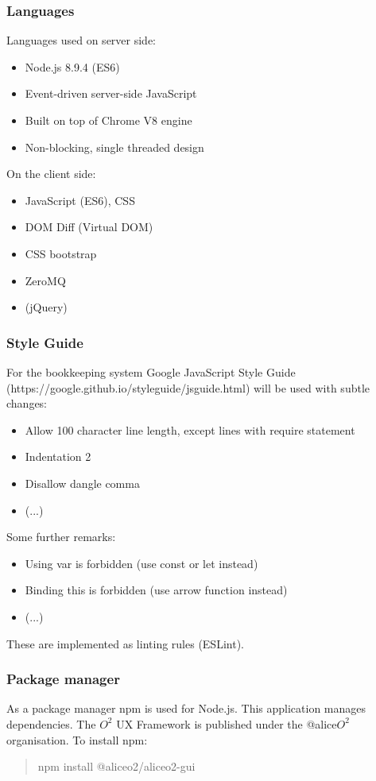 \subsubsection{Languages}
Languages used on server side:
\begin{itemize}
  \item Node.js 8.9.4 (ES6) 
  \item Event-driven server-side JavaScript
  \item Built on top of Chrome V8 engine
  \item Non-blocking, single threaded design
\end{itemize}

On the client side:
\begin{itemize}
  \item JavaScript (ES6), CSS
  \item DOM Diff (Virtual DOM)
  \item CSS bootstrap
  \item ZeroMQ
  \item (jQuery)
\end{itemize}

\subsubsection{Style Guide}
For the bookkeeping system Google JavaScript Style Guide (https://\-google.\-github\-.io/\-styleguide/jsguide.html) will be used with subtle changes:
\begin{itemize}
  \item Allow 100 character line length, except lines with require statement
  \item Indentation 2
  \item Disallow dangle comma
  \item (...)
\end{itemize}
Some further remarks:
\begin{itemize}
  \item Using var is forbidden (use const or let instead)
  \item Binding this is forbidden (use arrow function instead)
  \item (...)
\end{itemize}
These are implemented as linting rules (ESLint).

\subsubsection{Package manager}
As a package manager npm is used for Node.js. This application manages dependencies. The $O^2$ UX Framework is published under the @alice$O^2$ organisation. To install npm:
\begin{quote}
  npm install @aliceo2/aliceo2-gui
\end{quote}

